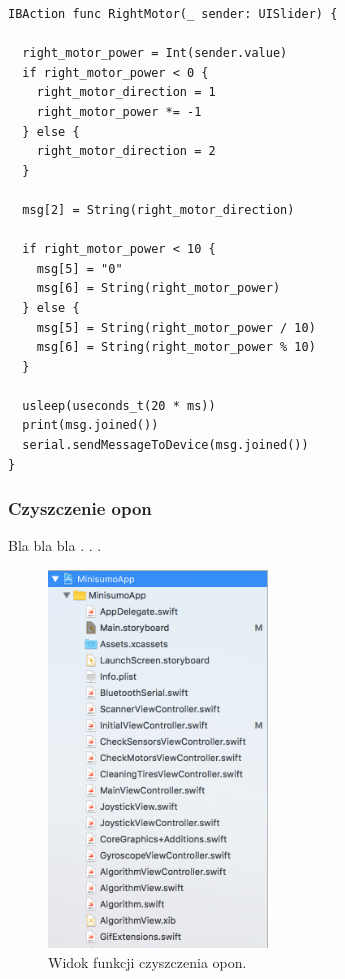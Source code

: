 \begin{minipage}{\textwidth}
	\begin{lstlisting}[label=motorscode,caption=Nasłuchiwanie zmiany położenia suwaka.]
IBAction func RightMotor(_ sender: UISlider) {
  
  right_motor_power = Int(sender.value)
  if right_motor_power < 0 {
    right_motor_direction = 1
    right_motor_power *= -1
  } else {
    right_motor_direction = 2
  }
    
  msg[2] = String(right_motor_direction)
    
  if right_motor_power < 10 {
    msg[5] = "0"
    msg[6] = String(right_motor_power)
  } else {
    msg[5] = String(right_motor_power / 10)
    msg[6] = String(right_motor_power % 10)
  }
    
  usleep(useconds_t(20 * ms))
  print(msg.joined())
  serial.sendMessageToDevice(msg.joined())
}
	\end{lstlisting}
\end{minipage}




\subsubsection{Czyszczenie opon}
Bla bla bla . . .

\begin{figure}[H]
	\centering
		\includegraphics[width=0.75\linewidth, height=10cm, keepaspectratio]{pic05/structure.png}
	\caption{Widok funkcji czyszczenia opon.}
	\label{fig:tires}	
\end{figure}